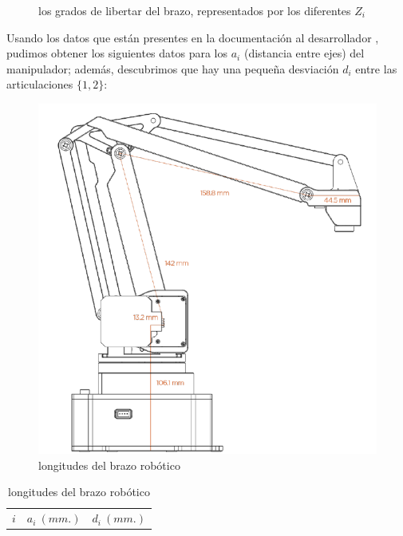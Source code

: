 \documentclass[a4paper,12pt]{article}
\begin{document}
\begin{figure}[H]
\begin{minipage}{.48\linewidth}
        \caption{los grados de libertar del brazo, representados por los diferentes $Z_i$}
        \label{fig:axis}
    \end{minipage}
\end{figure}

Usando los datos que están presentes en la documentación al desarrollador \cite{developer_guide_uarm},
pudimos obtener los siguientes datos para los $a_i$ (distancia entre ejes) del manipulador; además,
descubrimos que hay una pequeña desviación $d_i$ entre las articulaciones $\{1, 2\}$:

\begin{table}[ht]
    \begin{minipage}{.49\linewidth}
        \begin{figure}[H]
            \centering
            \includegraphics[width=\linewidth]{images/sizes.png}
            \caption{longitudes del brazo robótico \cite{developer_guide_uarm}}
            \label{fig:sizes}
        \end{figure}
    \end{minipage}
    \hfill
    \begin{minipage}{.49\linewidth}
        \centering
        \begin{tabular}{|| c | c c ||}
            \hline
            $i$ & $a_i~(mm.)$ & $d_i~(mm.)$ \\ [0.5ex]

\end{tabular}
\end{minipage}
\end{table}
\end{document}
